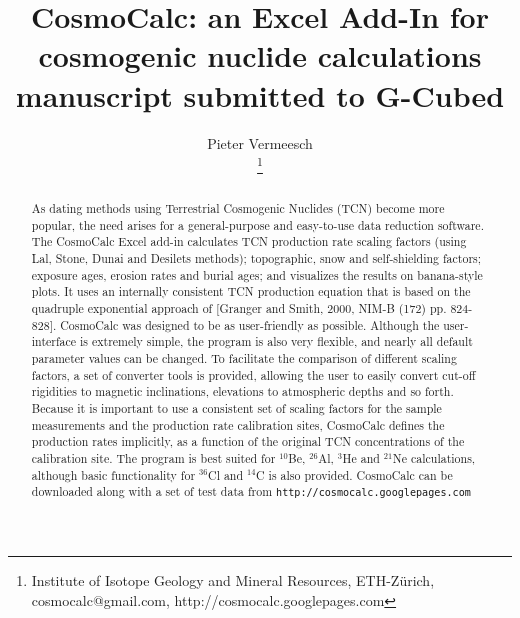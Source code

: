 \documentclass{article}
\title{CosmoCalc: an Excel Add-In for cosmogenic nuclide
calculations \\ {\normalsize manuscript submitted to G-Cubed}}
\author{Pieter Vermeesch 
\date{}
\footnote{Institute of Isotope Geology and Mineral Resources, ETH-Z\"{u}rich,
cosmocalc@gmail.com, http://cosmocalc.googlepages.com}
}
\begin{document}
\maketitle
\begin{abstract}
  As dating methods using Terrestrial Cosmogenic Nuclides (TCN) become
  more popular, the need  arises for a general-purpose and easy-to-use
  data reduction software.  The  CosmoCalc Excel add-in calculates TCN
  production  rate  scaling  factors  (using  Lal,  Stone,  Dunai  and
  Desilets  methods); topographic,  snow  and self-shielding  factors;
  exposure  ages, erosion rates  and burial  ages; and  visualizes the
  results on banana-style plots.  It uses an internally consistent TCN
  production  equation  that is  based  on  the quadruple  exponential
  approach of  [Granger and  Smith, 2000, NIM-B  (172) pp.   824-828]. 
  CosmoCalc was designed to be as user-friendly as possible.  Although
  the  user-interface is extremely  simple, the  program is  also very
  flexible, and  nearly all default  parameter values can be  changed. 
  To facilitate the comparison of  different scaling factors, a set of
  converter  tools is provided,  allowing the  user to  easily convert
  cut-off   rigidities  to   magnetic   inclinations,  elevations   to
  atmospheric depths and  so forth.  Because it is  important to use a
  consistent set  of scaling factors  for the sample  measurements and
  the  production  rate   calibration  sites,  CosmoCalc  defines  the
  production  rates implicitly,  as  a function  of  the original  TCN
  concentrations of the calibration  site.  The program is best suited
  for  $^{10}$Be,  $^{26}$Al,  $^{3}$He  and  $^{21}$Ne  calculations,
  although  basic functionality  for  $^{36}$Cl and  $^{14}$C is  also
  provided.  CosmoCalc can be downloaded along with a set of test data
  from \texttt{http://cosmocalc.googlepages.com}
\end{abstract}
\end{document}

